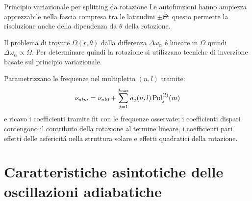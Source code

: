 \begin{frame}{Principio variazionale per splitting da rotazione}
Le autofunzioni hanno ampiezza apprezzabile nella fascia compresa tra le latitudini $\pm\Theta$: questo permette la risoluzione anche della dipendenza da $\theta$ della rotazione.

Il problema di trovare $\Omega(r,\theta)$ dalla differenza $\Delta\omega_{\alpha}$ \'e lineare in $\Omega$ quindi $\Delta\omega_{\alpha}\propto\Omega$. Per determinare quindi la rotazione si utilizzano tecniche di inverzione basate sul principio variazionale.


Parametrizzano le frequenze nel multipletto $(n,l)$ tramite:
\begin{equation}
\nu_{nlm}=\nu_{nl0}+\sum_{j=1}^{j_{\max}}a_j(n,l)\operatorname{Pol}_j^{(l)}(m)\label{eq:freqmulti}
\end{equation}
e ricavo i coefficienti tramite fit con le frequenze osservate; i coefficienti dispari contengono il contributo della rotazione al termine lineare, i coefficienti pari effetti delle asfericit\'a nella struttura solare e effetti quadratici della rotazione.

\end{frame}

\section{Caratteristiche asintotiche delle oscillazioni adiabatiche}

